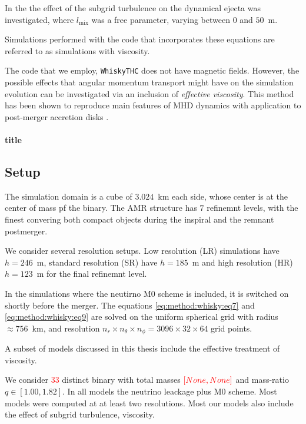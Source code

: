 \documentclass[11pt,a4paper,headinclude=true,DIV=14,BCOR=8mm,chapterprefix,listof=totoc,twoside,openright,abstracton]{scrbook}
\newcommand{\red}[1]{\textcolor{red}{#1}}
\begin{document}
In the \cite{Radice:2017lry} the effect of the subgrid turbulence on the dynamical ejecta was investigated, where $l_{\text{mix}}$ was a free parameter, varying between $0$ and $50$~m. 

Simulations performed with the code that incorporates these equations are referred to as simulations
with viscosity.

The code that we employ, \texttt{WhiskyTHC} does not have magnetic fields. 
However, the possible effects that angular momentum transport might have on the simulation evolution
can be investigated via an inclusion of \textit{effective viscosity}.
This method has been shown to reproduce main features of MHD dynamics with application to post-merger accretion
disks \cite{Fernandez:2018kax}.

\paragraph{title}


\subsection{Setup}



The simulation domain is a cube of $3.024$~km each side, whose center is at the center of mass pf the binary.
The AMR structure has $7$ refinemnt levels, with the finest convering both compact objects during the inspiral and the remnant postmerger.

We consider several resolution setups. Low resolution (LR) simulations have $h=246$~m, standard resolution (SR) 
have $h=185$~m and high resolution (HR) $h=123$~m for the final refinemnt level.

In the simulations where the neutirno M0 scheme is included, it is switched on shortly before the merger. 
The equations \eqref{eq:method:whisky:eq7} and \eqref{eq:method:whisky:eq9} are solved on the uniform spherical grid
with radius $\approx 756$~km, and resolution $n_r\times n_{\theta}\times n_{\phi} = 3096 \times 32 \times 64$
grid points.

A subset of models discussed in this thesis include the effective treatment of viscosity. 

We consider \red{$33$} distinct binary with total masses $\red{[None,None]}$ and mass-ratio $q\in[1.00,1.82]$.
In all models the neutrino leackage plus M0 scheme. Most models were computed at at least two resolutions. 
Most our models also include the effect of subgrid turbulence, viscosity.
\end{document}
